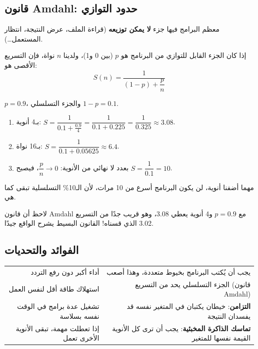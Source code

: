 \subsection{قانون \textenglish{Amdahl}: حدود التوازي}
معظم البرامج فيها جزء \textbf{لا يمكن توزيعه} (قراءة الملف، عرض النتيجة، انتظار المستعمل\dots).

\begin{tarif}
    إذا كان الجزء القابل للتوازي من البرنامج هو $p$ (بين 0 و1)، ولدينا $n$ نواة، فإن التسريع الأقصى هو:
    \[ S(n) = \frac{1}{(1 - p) + \dfrac{p}{n}} \]
\end{tarif}

\begin{khatwa}
    $p = 0.9$، والجزء التسلسلي $1 - p = 0.1$.
    \begin{enumerate}
        \item بـ4 أنوية: $S = \dfrac{1}{0.1 + \frac{0.9}{4}} = \dfrac{1}{0.1 + 0.225} = \dfrac{1}{0.325} \approx 3.08$.
        \item بـ16 نواة: $S = \dfrac{1}{0.1 + 0.05625} \approx 6.4$.
        \item بعدد لا نهائي من الأنوية: $\dfrac{p}{n} \rightarrow 0$، فيصبح $S = \dfrac{1}{0.1} = 10$.
    \end{enumerate}
    مهما أضفنا أنوية، لن يكون البرنامج أسرع من 10 مرات، لأن الـ10\% التسلسلية تبقى كما هي.
\end{khatwa}

\begin{hal}
    لاحظ أن قانون \textenglish{Amdahl} مع $p = 0.9$ و4 أنوية يعطي \textenglish{3.08}، وهو قريب جدًا من التسريع
    \textenglish{3.02} الذي قسناه! القانون البسيط يشرح الواقع جيدًا.
\end{hal}

\subsection{الفوائد والتحديات}
\begin{center}
\small
\begin{tabularx}{\linewidth}{|R|R|}
    \hline
     &  \\ \hline
    أداء أكبر دون رفع التردد & يجب أن يُكتب البرنامج بخيوط متعددة، وهذا أصعب \\ \hline
    استهلاك طاقة أقل لنفس العمل & الجزء التسلسلي يحد من التسريع (قانون \textenglish{Amdahl}) \\ \hline
    تشغيل عدة برامج في الوقت نفسه بسلاسة & \textbf{التزامن}: خيطان يكتبان في المتغير نفسه قد يفسدان النتيجة \\ \hline
    إذا تعطلت مهمة، تبقى الأنوية الأخرى تعمل & \textbf{تماسك الذاكرة المخبئية}: يجب أن ترى كل الأنوية القيمة نفسها للمتغير \\ \hline
\end{tabularx}
\end{center}

